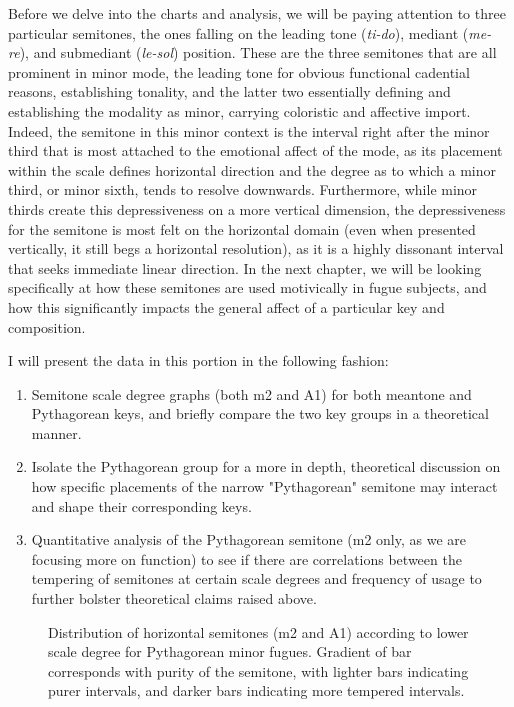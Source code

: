 Before we delve into the charts and analysis, we will be paying
attention to three particular semitones, the ones falling on the leading
tone (\emph{ti-do}), mediant (\emph{me-re}), and submediant
(\emph{le-sol}) position. These are the three semitones that are all
prominent in minor mode, the leading tone for obvious functional
cadential reasons, establishing tonality, and the latter two essentially
defining and establishing the modality as minor, carrying coloristic and
affective import. Indeed, the semitone in this minor context is the
interval right after the minor third that is most attached to the
emotional affect of the mode, as its placement within the scale defines
horizontal direction and the degree as to which a minor third, or minor
sixth, tends to resolve downwards. Furthermore, while minor thirds
create this depressiveness on a more vertical dimension, the
depressiveness for the semitone is most felt on the horizontal domain
(even when presented vertically, it still begs a horizontal resolution),
as it is a highly dissonant interval that seeks immediate linear
direction. In the next chapter, we will be looking specifically at how
these semitones are used motivically in fugue subjects, and how this
significantly impacts the general affect of a particular key and
composition.

I will present the data in this portion in the following fashion:

\begin{enumerate}
\def\labelenumi{\arabic{enumi}.}
\tightlist
\item
  Semitone scale degree graphs (both m2 and A1) for both meantone and
  Pythagorean keys, and briefly compare the two key groups in a
  theoretical manner.
\item
  Isolate the Pythagorean group for a more in depth, theoretical
  discussion on how specific placements of the narrow "Pythagorean"
  semitone may interact and shape their corresponding keys.
\item
  Quantitative analysis of the Pythagorean semitone (m2 only, as we are
  focusing more on function) to see if there are correlations between
  the tempering of semitones at certain scale degrees and frequency of
  usage to further bolster theoretical claims raised above.
\end{enumerate}



\begin{figure}[H]
\vspace{1.5em}
    \centering
    \caption[Distribution of horizontal semitones, according to lower scale degree for Pythagorean minor fugues. ]{Distribution of horizontal semitones (m2 and A1) according to lower scale degree for Pythagorean minor fugues. Gradient of bar corresponds with purity of the semitone, with lighter bars indicating purer intervals, and darker bars indicating more tempered intervals.}
\end{figure}


